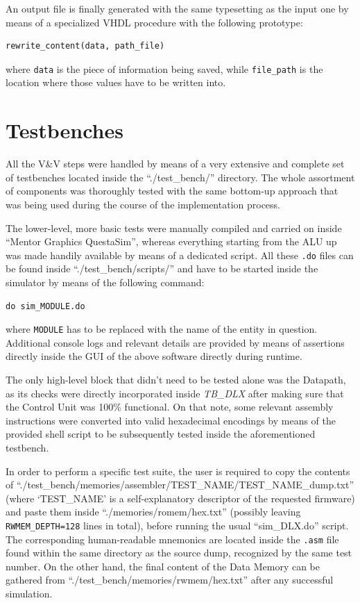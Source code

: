 An output file is finally generated with the same typesetting as the input one by means of a specialized VHDL procedure with the following prototype:
\begin{center}
\begin{BVerbatim}
rewrite_content(data, path_file)
\end{BVerbatim}
\end{center}
where \texttt{data} is the piece of information being saved, while \texttt{file\_path} is the location where those values have to be written into.

\section{Testbenches}
All the V\&V steps were handled by means of a very extensive and complete set of testbenches located inside the ``./test\_bench/'' directory. The whole assortment of components was thoroughly tested with the same bottom-up approach that was being used during the course of the implementation process.

The lower-level, more basic tests were manually compiled and carried on inside ``Mentor Graphics QuestaSim'', whereas everything starting from the ALU up was made handily available by means of a dedicated script. All these \texttt{.do} files can be found inside ``./test\_bench/scripts/'' and have to be started inside the simulator by means of the following command:
\begin{center}
\begin{BVerbatim}
do sim_MODULE.do
\end{BVerbatim}
\end{center}
where \texttt{MODULE} has to be replaced with the name of the entity in question. Additional console logs and relevant details are provided by means of assertions directly inside the GUI of the above software directly during runtime.

The only high-level block that didn't need to be tested alone was the Datapath, as its checks were directly incorporated inside \emph{TB\_DLX} after making sure that the Control Unit was 100\% functional. On that note, some relevant assembly instructions were converted into valid hexadecimal encodings by means of the provided shell script to be subsequently tested inside the aforementioned testbench.

\vspace{\baselineskip}

In order to perform a specific test suite, the user is required to copy the contents of ``./test\_bench/me\-mories/assembler/TEST\_NAME/TEST\_NAME\_dump.txt'' (where `TEST\_NAME' is a self-explanatory descriptor of the requested firmware) and paste them inside ``./memories/romem/hex.txt'' (possibly leaving \texttt{RWMEM\_DEPTH=128} lines in total), before running the usual ``sim\_DLX.do'' script. The corresponding human-readable mnemonics are located inside the \texttt{.asm} file found within the same directory as the source dump, recognized by the same test number. On the other hand, the final content of the Data Memory can be gathered from ``./test\_bench/memories/rwmem/hex.txt'' after any successful simulation.

